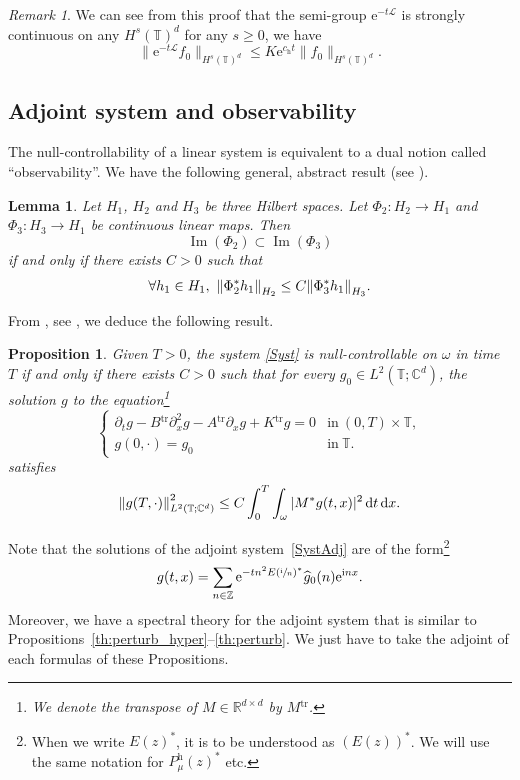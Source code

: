 \documentclass[JEP,XML,SOM,Unicode,NoEqCountersInSection]{cedram}
\let\mathcal\mathscr
\theoremstyle{plain}
\newtheorem{prop}[theorem]{Proposition}
\newtheorem{lemma}[theorem]{Lemma}
\theoremstyle{definition}
\theoremstyle{remark}
\newtheorem{remark}[theorem]{Remark}
\DeclareMathOperator{\Ima}{Im}
\newcommand{\norme}[1]{\left\lVert#1\right\rVert}
\newcommand{\diff}[1][-3]{\ensuremath{\mathop{}\mkern#1mu\mathrm{d}}}
\newcommand{\set}{\mathbb}
\renewcommand{\C}{\set{C}}
\newcommand{\T}{\set{T}}
\newcommand{\Tr}[1]{{#1}{}^{\mathrm{tr}}}
\newcommand{\h}{{\mathrm h}}
\newcommand{\eu}{\mathrm e}
\newcommand{\iu}{\mathrm i}
\let\originalleft\left
\let\originalright\right
\renewcommand{\left}{\mathopen{}\mathclose\bgroup\originalleft}
\renewcommand{\right}{\aftergroup\egroup\originalright}
\begin{document}
\begin{remark}\label{rk:semigroup_Hs}
We can see from this proof that the semi-group $\eu^{-t\mathcal L}$ is strongly continuous on any $H^s(\T)^d$ for any $s\geq 0$, \ie we have
\[
\|\eu^{-t\mathcal L} f_0\|_{H^s(\T)^d} \leq K\eu^{c_\h t}\|f_0\|_{H^s(\T)^d}.
\]
\end{remark}

\subsection{Adjoint system and observability}
\label{Paragraphdual}

The null-controllability of a linear system is equivalent to a dual notion called ``observability''. We have the following general, abstract result (see \cite[Lem.\,2.48]{coron_2007}).
\begin{lemma}
\label{LemmaDuality}
Let $H_1$, $H_2$ and $H_3$ be three Hilbert spaces. Let $\Phi_2\colon H_2 \to H_1$ and $\Phi_3\colon H_3 \to H_1$ be continuous linear maps. Then
\[
\Ima(\Phi_2) \subset \Ima(\Phi_3)
\]
if and only if there exists $C>0$ such that
\[
\forall h_1 \in H_1,\ \norme{\Phi_2^{*} h_1}_{H_2} \leq C \norme{\Phi_3^{*} h_1}_{H_3}.
\]
\end{lemma}

\pagebreak[2]
From , see \cite[Th.\,2.44]{coron_2007}, we deduce the following result.
\begin{prop}\label{Hum}
Given $T>0$, the system \eqref{Syst} is null-controllable on $\omega$ in time~$T$ if and only if there exists $C>0$ such that for every $g_0 \in L^2(\T;\C^{d})$, the solution $g$ to the equation\footnote{We denote the transpose of $M\in\set R^{d\times d}$ by $\Tr M$.}
\begin{equation}
\label{SystAdj}
\begin{cases}
\partial_t g - \Tr{B} \partial_{x}^2 g - \Tr{A} \partial_x g + \Tr{K} g = 0&\text{in}\ (0,T)\times\T,\\
g(0,\cdot)=g_{0}& \text{in}\ \T.
\end{cases}
\end{equation}
satisfies
\begin{equation}
\label{ObsHumG}
\norme{g(T,\cdot)}_{L^2(\T;\C^{d})}^2 \leq C \int_{0}^{T} \int_{\omega} |M^* g(t,x)|^{2} \diff t \diff x.
\end{equation}
\end{prop}

Note that the solutions of the adjoint system~\eqref{SystAdj} are of the form\footnote{When we write $E(z)^\ast$, it is to be understood as $(E(z))^\ast$. We will use the same notation for $P_\mu^\h(z)^\ast$ etc.}
\begin{equation}\label{eq:sol_adj}
g(t,x) = \sum_{n\in\set Z} \eu^{- tn^2E\left(\sfrac{\iu}{n}\right)^\ast} \widehat{g}_0(n) \eu^{\iu nx}.
\end{equation}
Moreover, we have a spectral theory for the adjoint system that is similar to Propositions~\ref{th:perturb_hyper}--\ref{th:perturb}. We just have to take the adjoint of each formulas of these Propositions.
\end{document}
